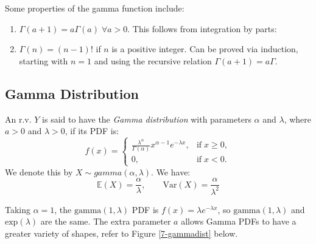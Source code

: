\documentclass{article}
\begin{document}
\noindent Some properties of the gamma function include: \begin{enumerate}
    \item $\Gamma (a + 1) = a \Gamma (a) \; \forall a > 0$. This follows from integration by parts: \begin{equation*}
    \end{equation*}
    \item $\Gamma (n) = (n-1)!$ if $n$ is a positive integer. Can be proved via induction, starting with $n=1$ and using the recursive relation $\Gamma (a+1) = a \Gamma$. 
\end{enumerate}

\subsection{Gamma Distribution}
\begin{definition}
    An r.v. $Y$ is said to have the \textit{Gamma distribution} with parameters $\alpha$ and $\lambda$, where $a>0$ and $\lambda >0 $, if its PDF is: \begin{equation}
        f(x) = \begin{cases}
            \displaystyle\frac{\lambda^{\alpha}}{\Gamma(\alpha)}x^{\alpha-1}e^{-\lambda x}, & \text{if} \; x\geq 0, \\ 
            0, & \text{if} \; x< 0.
        \end{cases}
    \end{equation} We denote this by $X \sim gamma (\alpha, \lambda)$. We have: \begin{equation*}
        \mathbb{E}(X) = \frac{\alpha}{\lambda}, \qquad \text{Var}(X) = \frac{\alpha}{\lambda^{2}}
    \end{equation*}
\end{definition}

\noindent Taking $\alpha=1$, the $\text{gamma}(1,\lambda)$ PDF is $f(x) = \lambda e^{-\lambda x}$, so $\text{gamma}(1, \lambda)$ and $\text{exp}(\lambda)$ are the same. The extra parameter $a$ allows Gamma PDFs to have a greater variety of shapes, refer to Figure \ref{7-gammadist} below. 
\end{document}
